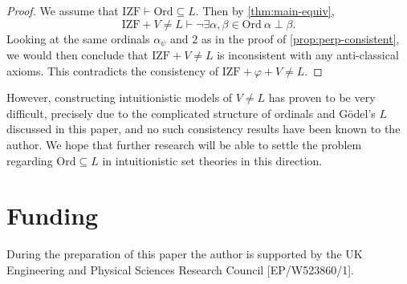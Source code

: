 \documentclass{asl}
\theoremstyle{plain}
\newcommand{\Ord}{\mathrm{Ord}}
\begin{document}
\begin{proof}
  We assume that $\mathrm{IZF} \vdash \Ord \subseteq L$. Then by \autoref{thm:main-equiv},
  \[\mathrm{IZF} + V \neq L \vdash \neg \exists \alpha, \beta \in \Ord \ \alpha \perp \beta.\]
  Looking at the same ordinals $\alpha_\psi$ and $2$ as in the proof of \autoref{prop:perp-consistent}, we would then conclude that $\mathrm{IZF} + V \neq L$ is inconsistent with any anti-classical axioms. This contradicts the consistency of $\mathrm{IZF} + \varphi + V \neq L$.
\end{proof}

However, constructing intuitionistic models of $V \neq L$ has proven to be very difficult, precisely due to the complicated structure of ordinals and G\"odel's $L$ discussed in this paper, and no such consistency results have been known to the author. We hope that further research will be able to settle the problem regarding $\Ord \subseteq L$ in intuitionistic set theories in this direction.

\section*{Funding}\normalfont

During the preparation of this paper the author is supported by the UK Engineering and Physical Sciences Research Council [EP/W523860/1].



\end{document}

